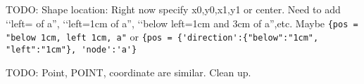 

\renewcommand\TITLE{latextool}

\usetikzlibrary{shapes.geometric}
\usetikzlibrary{arrows}
\usetikzlibrary{fit}
\usetikzlibrary{positioning}
\usepackage{xcolor}
\usepackage{mathpartir}


\topmatter
    
\newpage

TODO:
Shape location: Right now specify x0,y0,x1,y1 or center.
Need to add
\lq\lq left= of a'',
\lq\lq left=1cm of a'', 
\lq\lq below left=1cm and 3cm of a'',etc.
Maybe
\verb!{pos = "below 1cm, left 1cm, a"!
or
\verb!{pos = {'direction':{"below":"1cm", "left":"1cm"}, 'node':'a'}!


TODO:
Point, POINT, coordinate are similar.
Clean up.

\newpage{}
\newpage{}
\newpage{} 
\newpage{}
\newpage{}

\newpage{} 
\newpage{} 
\newpage{}
\newpage{}
\newpage{}
\newpage{}
\newpage{}
\newpage{}
\newpage{}
\newpage{}
\newpage{}

\newpage{}
\newpage{}
\newpage{}
\newpage{}
\newpage{}
\newpage{}
\newpage{}
\newpage{}
\newpage{}
\begin{comment}
\newpage\myinput{chap-line.tex}
\newpage\myinput{rect.tex}
\newpage\myinput{rectcontainer.tex}
\newpage\myinput{tabrect.tex}
\newpage\myinput{position.tex}
\newpage\myinput{vphantom.tex}
\newpage\myinput{chap-tree.tex}
\newpage\myinput{chap-graph.tex}
\newpage\myinput{frame.tex}
\newpage\myinput{test-verbatim-spacing.tex}
\newpage\myinput{vec2d.tex}
\newpage\myinput{line-graph.tex}
\newpage\myinput{line-graph-nonnumeric.tex}
\newpage\myinput{isosceles-triangle.tex}

\newpage\myinput{er-diagram.tex}
\newpage\myinput{chap-uml.tex}
\newpage\myinput{matrix.tex}
\newpage\myinput{boardgames.tex}
\newpage\myinput{prooftree.tex}

\newpage\myinput{kmap.tex}
\newpage\myinput{logic-design.tex}

\newpage\myinput{chap-data-structures.tex}

\newpage\myinput{chap-automata.tex}
\newpage\myinput{automata.tex}
\end{comment}

